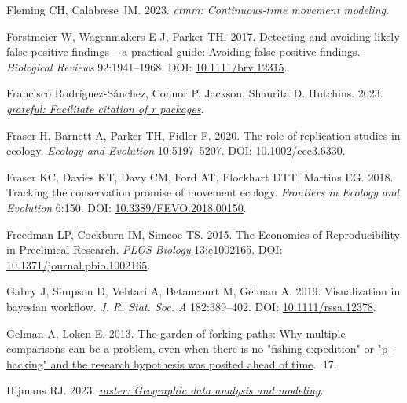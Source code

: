 \documentclass[10pt,a4paper]{article}
\newlength{\cslhangindent}
\newlength{\cslentryspacingunit} %
\newenvironment{CSLReferences}[2] %
 {%
  \setlength{\parindent}{0pt}
  \ifodd #1
  \let\oldpar\par
  \def\par{\hangindent=\cslhangindent\oldpar}
  \fi
  \setlength{\parskip}{#2\cslentryspacingunit}
 }%
 {}
\begin{document}
\begin{CSLReferences}{1}{0}
\leavevmode{}%
Fleming CH, Calabrese JM. 2023. \emph{{ctmm}: Continuous-time movement modeling}.

\leavevmode{}%
Forstmeier W, Wagenmakers E-J, Parker TH. 2017. Detecting and avoiding likely false-positive findings -- a practical guide: {Avoiding} false-positive findings. \emph{Biological Reviews} 92:1941--1968. DOI: \href{https://doi.org/10.1111/brv.12315}{10.1111/brv.12315}.

\leavevmode{}%
Francisco Rodríguez-Sánchez, Connor P. Jackson, Shaurita D. Hutchins. 2023. \emph{\href{https://github.com/Pakillo/grateful}{{grateful}: Facilitate citation of r packages}}.

\leavevmode{}%
Fraser H, Barnett A, Parker TH, Fidler F. 2020. The role of replication studies in ecology. \emph{Ecology and Evolution} 10:5197--5207. DOI: \href{https://doi.org/10.1002/ece3.6330}{10.1002/ece3.6330}.

\leavevmode{}%
Fraser KC, Davies KT, Davy CM, Ford AT, Flockhart DTT, Martins EG. 2018. Tracking the conservation promise of movement ecology. \emph{Frontiers in Ecology and Evolution} 6:150. DOI: \href{https://doi.org/10.3389/FEVO.2018.00150}{10.3389/FEVO.2018.00150}.

\leavevmode{}%
Freedman LP, Cockburn IM, Simcoe TS. 2015. The {Economics} of {Reproducibility} in {Preclinical} {Research}. \emph{PLOS Biology} 13:e1002165. DOI: \href{https://doi.org/10.1371/journal.pbio.1002165}{10.1371/journal.pbio.1002165}.

\leavevmode{}%
Gabry J, Simpson D, Vehtari A, Betancourt M, Gelman A. 2019. Visualization in bayesian workflow. \emph{J. R. Stat. Soc. A} 182:389--402. DOI: \href{https://doi.org/10.1111/rssa.12378}{10.1111/rssa.12378}.

\leavevmode{}%
Gelman A, Loken E. 2013. \href{http://www.stat.columbia.edu/~gelman/research/unpublished/p_hacking.pdf}{The garden of forking paths: {Why} multiple comparisons can be a problem, even when there is no "fishing expedition" or "p-hacking" and the research hypothesis was posited ahead of time}. :17.

\leavevmode{}%
Hijmans RJ. 2023. \emph{\href{https://CRAN.R-project.org/package=raster}{{raster}: Geographic data analysis and modeling}}.


\end{CSLReferences}
\end{document}
